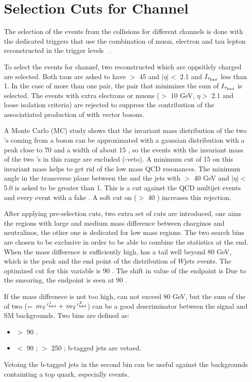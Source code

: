 \section{\texorpdfstring{Selection Cuts for \Tau\Tau Channel}{Selection Cuts for Tau-Tau Channel}}
\label{sect:tauTauCuts}
The selection of the events from the collisions for different channels 
is done with the dedicated triggers that use the combination of muon, electron 
and tau lepton reconstructed in the trigger levels ~\cite{CMS:2013hoa,Chatrchyan:2012xi,Chatrchyan:2011nv}.

To select the events for \Tau\Tau channel, two reconstructed \Tau which are oppsitlely charged are selected. Both taus are asked to 
have \PT $>$ 45 \GeV and $|\eta| <$ 2.1 and $I_{\tau_{\rm had}}$ less than 1\GeV. In the case of more than one pair, the pair that minimizes the sum of
$I_{\tau_{\rm had}}$ is selected.
The events with extra electrons or muons (\PT $>$ 10 GeV, $\eta >$ 2.1 and loose isolation criteria) 
are rejected to suppress the contribution of the associatiated production of \Z with vector bosons.

A Monte Carlo (MC) study shows that the invariant mass distribution of the two \Tau's coming from a \Z boson can be approximated with a gaussian 
distribution with a peak close to 70 \GeV and a width of about 15 \GeV, so the events with the invariant mass of  
the two \Tau's in this range are excluded (\Z-veto). A minimum cut of 15 \GeV on this invariant mass helps to get rid of the low mass
QCD resonances. The minimum angle in the transverse plane between the \MET and the jets with \PT $>$ 40 GeV and $|\eta| <$ 5.0 
is asked to be greater than 1. This is a cut against the QCD multijet events and every event with a fake \MET. A soft cut on 
\mttwo ($>$ 40 \GeV) increases this rejection.

After applying pre-selection cuts, two extra set of cuts are introduced, one aims the regions with large and medium mass difference between 
charginos and neutralinos, the other one is dedicated for low mass regions. The two search bins are chosen to be exclusive in order 
to be able to combine the statistics at the end. When the mass difference is sufficiently high, \mttwo has a tail well beyond 80 GeV, which is 
the peak  and the end point of the \mt distribution of $W$jets events. The optimized cut for this variable is 90 \GeV. The shift in 
value of the endpoint is Due to the smearing, the endpoint is seen at  90 \GeV.

If the mass diffrenece is not too high, \mttwo can not exceed 80 GeV, 
but the sum of the \mt of two \Tau (\SumMT = $\,{m_{\rm T}}^{\tau_{\rm had}^1} + \,{m_{\rm T}}^{\tau_{\rm had}^2}$) can be a good descriminator between the signal and SM backgrounds. 
Two bins are defined as:
\begin{itemize}
\item[\binone] \mttwo $>$ 90 \GeV.
\item[\bintwo] \mttwo $<$ 90 \GeV; \SumMT $>$ 250 \GeV; b-tagged jets are vetoed.
\end{itemize}
Vetoing the b-tagged jets in the second bin can be useful against the backgrounds containting a top quark, especially \ttbar events. 


